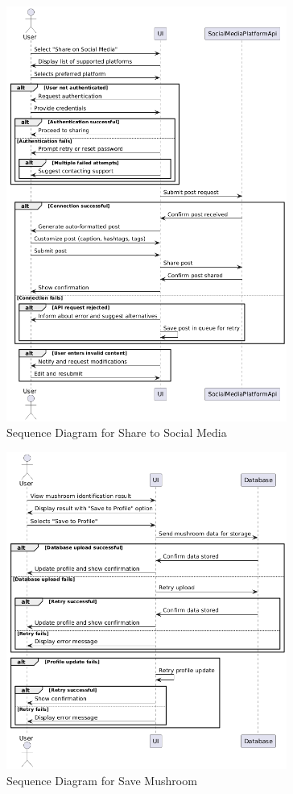 \documentclass[]{article}
\begin{document}
\vspace{1.5cm}

\begin{figure}[H]
    \centering
    \includegraphics[width=0.82\textwidth]{sharetosocialmedia.png}
    \caption{Sequence Diagram for Share to Social Media}
    \label{fig:identify}
\end{figure}

\vspace{0.4cm}

\begin{figure}[H]
    \centering
    \includegraphics[width=0.82\textwidth]{savemushroom.png}
    \caption{Sequence Diagram for Save Mushroom}
    \label{fig:recipe}
\end{figure}
\end{document}
